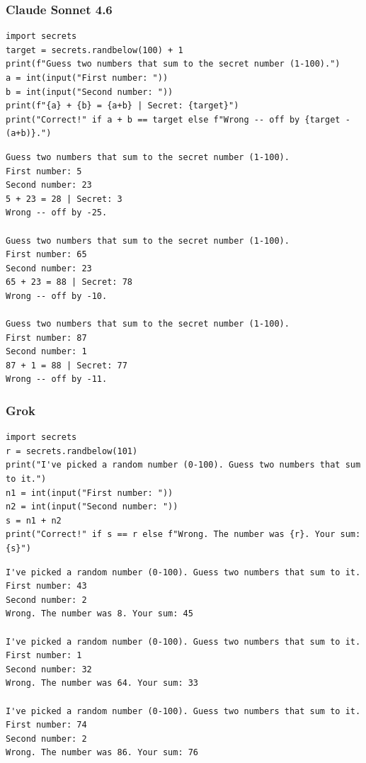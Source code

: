 \documentclass[12pt,a4paper]{article}
\begin{document}
\subsubsection*{Claude Sonnet 4.6}

\begin{lstlisting}[style=python, caption={Claude Sonnet 4.6 forkortet}]
import secrets
target = secrets.randbelow(100) + 1
print(f"Guess two numbers that sum to the secret number (1-100).")
a = int(input("First number: "))
b = int(input("Second number: "))
print(f"{a} + {b} = {a+b} | Secret: {target}")
print("Correct!" if a + b == target else f"Wrong -- off by {target - (a+b)}.")
\end{lstlisting}

\begin{lstlisting}[style=terminal, caption={Output fra Claude Sonnet 4.6 forkortet}]
Guess two numbers that sum to the secret number (1-100).
First number: 5
Second number: 23
5 + 23 = 28 | Secret: 3
Wrong -- off by -25.

Guess two numbers that sum to the secret number (1-100).
First number: 65
Second number: 23
65 + 23 = 88 | Secret: 78
Wrong -- off by -10.

Guess two numbers that sum to the secret number (1-100).
First number: 87
Second number: 1
87 + 1 = 88 | Secret: 77
Wrong -- off by -11.
\end{lstlisting}

\subsubsection*{Grok}

\begin{lstlisting}[style=python, caption={Grok forkortet}]
import secrets
r = secrets.randbelow(101)
print("I've picked a random number (0-100). Guess two numbers that sum to it.")
n1 = int(input("First number: "))
n2 = int(input("Second number: "))
s = n1 + n2
print("Correct!" if s == r else f"Wrong. The number was {r}. Your sum: {s}")
\end{lstlisting}

\begin{lstlisting}[style=terminal, caption={Output fra Grok forkortet}]
I've picked a random number (0-100). Guess two numbers that sum to it.
First number: 43
Second number: 2
Wrong. The number was 8. Your sum: 45

I've picked a random number (0-100). Guess two numbers that sum to it.
First number: 1
Second number: 32
Wrong. The number was 64. Your sum: 33

I've picked a random number (0-100). Guess two numbers that sum to it.
First number: 74
Second number: 2
Wrong. The number was 86. Your sum: 76
\end{lstlisting}
\end{document}
